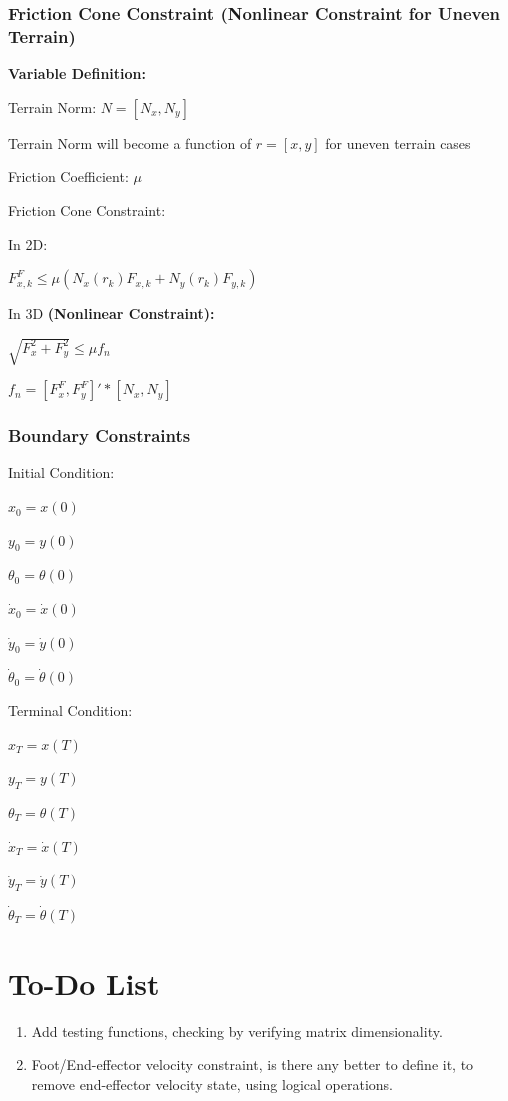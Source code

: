 \documentclass[a4paper,10pt]{article}
\begin{document}
\subsubsection{Friction Cone Constraint (Nonlinear Constraint for Uneven Terrain)}

\textbf{Variable Definition:}

Terrain Norm: $N = [N_x, N_y]$

Terrain Norm will become a function of $r = [x,y]$ for uneven terrain cases

Friction Coefficient: $\mu$

\vspace{3mm}

Friction Cone Constraint:

In 2D:

$F^F_{x,k} \leq \mu(N_x(r_k)F_{x,k} + N_y(r_k)F_{y,k})$

In 3D \textbf{(Nonlinear Constraint):}

$\sqrt{F^2_x + F^2_y} \leq \mu f_n$

$f_n = [F^F_x,F^F_y]'*[N_x,N_y]$



\subsubsection{Boundary Constraints}

Initial Condition: 

$x_0 = x(0)$

$y_0 = y(0)$

$\theta_0 = \theta(0)$

$\dot{x}_0 = \dot{x}(0)$

$\dot{y}_0 = \dot{y}(0)$

$\dot{\theta}_0 = \dot{\theta}(0)$

\vspace{2mm}

Terminal Condition:

$x_T = x(T)$

$y_T = y(T)$

$\theta_T = \theta(T)$

$\dot{x}_T = \dot{x}(T)$

$\dot{y}_T = \dot{y}(T)$

$\dot{\theta}_T = \dot{\theta}(T)$

\vspace{3mm}

\section{To-Do List}
\begin{enumerate}
	\item Add testing functions, checking by verifying matrix dimensionality.
	\item Foot/End-effector velocity constraint, is there any better to define it, to remove end-effector velocity state, using logical operations.
\end{enumerate}

\medskip
\newpage

\end{document}
